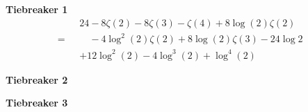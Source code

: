 \documentclass{beamer}
\begin{document}
\begin{frame}
    \vspace*{70pt}
    \textbf{Tiebreaker 1}
    \vfill
    \pause\\[10pt]
    \[=\boxed{
    \begin{aligned}
        &24 - 8\zeta(2) - 8\zeta(3) - \zeta(4) + 8\log(2)\zeta(2) \\
        &\quad - 4\log^2(2)\zeta(2) + 8\log(2)\zeta(3)-24\log2 \\
        &+12\log^2(2)-4\log^3(2)+\log^4(2)
    \end{aligned}
    }
    \]
    \vfill
\end{frame}

\begin{frame}
    \vspace*{70pt}
    \textbf{Tiebreaker 2}
    \vfill
    \pause\\[10pt]
\end{frame}

\begin{frame}
    \vspace*{70pt}
    \textbf{Tiebreaker 3}
    \vfill
    \pause\\[10pt]
\end{frame}
\end{document}
